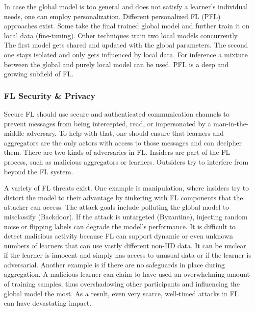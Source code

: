 In case the global model is too general and does not satisfy a
learner's individual needs, one can employ personalization.
Different personalized FL (PFL) approaches exist.
Some take the final trained global model and further train it on local data (fine-tuning).
Other techniques train two local models concurrently.
The first model gets shared and updated with the global parameters.
The second one stays isolated and only gets influenced by local data.
For inference a mixture between the global and purely local model can be used.
PFL is a deep and growing subfield of FL.


\subsubsection{FL Security \& Privacy}
Secure FL should use secure and authenticated communication channels
to prevent messages from being intercepted, read,
or impersonated by a man-in-the-middle adversary.
To help with that, one should ensure that 
learners and aggregators are the only actors with
access to those messages and can decipher them.
There are two kinds of adversaries in FL.
Insiders are part of the FL process, such as
malicious aggregators or learners.
Outsiders try to interfere from beyond the FL system.

A variety of FL threats exist.
One example is manipulation, where insiders try to distort
the model to their advantage by tinkering with FL components
that the attacker can access.
The attack goals include polluting the global model
to misclassify (Backdoor).
If the attack is untargeted (Byzantine), injecting random noise or
flipping labels can degrade the model's performance.
It is difficult to detect malicious activity because
FL can support dynamic or even unknown numbers of learners
that can use vastly different non-IID data.
It can be unclear if the learner is innocent and simply has
access to unusual data or if the learner is adversarial.
Another example is if there are no safeguards in place during aggregation.
A malicious learner can claim to have used an overwhelming amount of training samples,
thus overshadowing other participants and influencing the global model the most.
As a result, even very scarce, well-timed attacks in FL can have devastating impact.

